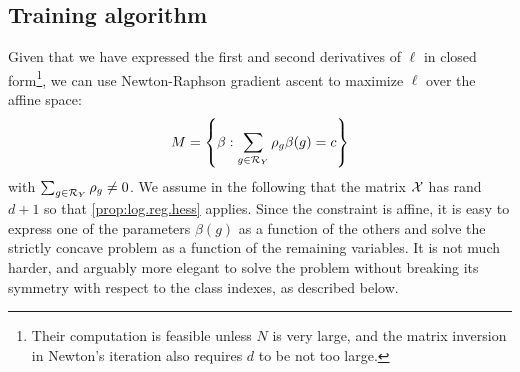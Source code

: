 \subsection{Training algorithm}
%
%
%

Given that we have expressed the first and second derivatives of $\ell$ in closed form\footnote{Their computation is feasible unless $N$ is very large, and the matrix inversion in Newton's iteration also requires $d$ to be not too large.}, we can use  Newton-Raphson gradient ascent to maximize $\ell$ over the  affine space:
\[
M = \left\{  \beta: \sum_{g\in {\mathcal R}_Y} \rho_g \beta(g) = c \right\}
\]
with $\sum_{g\in{\mathcal R}_Y} \rho_g \neq 0$. We assume in the following that the matrix ${\mathcal X}$ has rand $d+1$ so that \cref{prop:log.reg.hess} applies. Since the constraint is affine, it is easy to express one of the parameters $\beta(g)$ as a function of the others and solve the strictly concave problem as a function of the remaining variables. It is not much harder, and arguably more elegant to solve the problem without breaking its symmetry with respect to the class indexes, as described below. 

